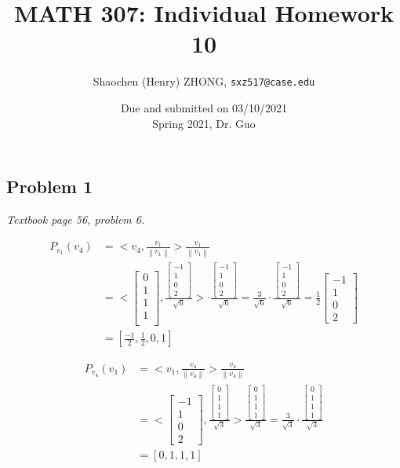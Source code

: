\documentclass[11pt]{article}
\newcommand{\ilc}{\texttt}
\providecommand{\qbm}[1]{\begin{bmatrix} #1 \end{bmatrix}}
\providecommand{\norm}[1]{\left\lVert #1 \right\rVert}
\begin{document}
\title{\textbf{MATH 307: Individual Homework 10}}


\author{Shaochen (Henry) ZHONG, \ilc{sxz517@case.edu}}

\date{Due and submitted on 03/10/2021 \\ Spring 2021, Dr. Guo}
\maketitle



\subsection*{Problem 1}
\textit{Textbook page 56, problem 6.}\newline


\begin{align*}
    P_{v_1}(v_4) &= < v_4, \frac{v_1}{\norm{v_1}} > \frac{v_1}{\norm{v_1}} \\
    &= < \qbm{0 \\ 1 \\ 1 \\ 1\\}, \frac{\qbm{-1 \\ 1 \\ 0 \\ 2}}{\sqrt{6}} > \cdot \frac{\qbm{-1 \\ 1 \\ 0 \\ 2}}{\sqrt{6}} = \frac{3}{\sqrt{6}} \cdot \frac{\qbm{-1 \\ 1 \\ 0 \\ 2}}{\sqrt{6}} = \frac{1}{2} \qbm{-1 \\ 1 \\ 0 \\ 2} \\
    &= [\frac{-1}{2}, \frac{1}{2}, 0, 1]
\end{align*}

\begin{align*}
    P_{v_4}(v_1) &= < v_1, \frac{v_4}{\norm{v_4}} > \frac{v_4}{\norm{v_4}} \\
    &= < \qbm{-1 \\ 1 \\ 0 \\ 2}, \frac{\qbm{0 \\ 1 \\ 1 \\ 1}}{\sqrt{3}} > \frac{\qbm{0 \\ 1 \\ 1 \\ 1}}{\sqrt{3}}
    = \frac{3}{\sqrt{3}} \cdot \frac{\qbm{0 \\ 1 \\ 1 \\ 1}}{\sqrt{3}} \\
    &= [0, 1, 1, 1]
\end{align*}
\end{document}
